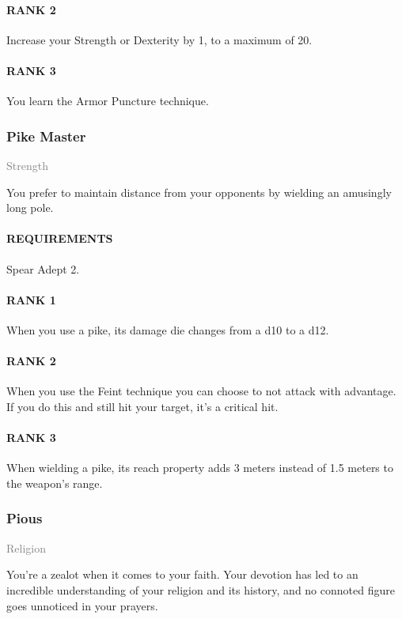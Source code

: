 \paragraph{RANK 2} Increase your Strength or Dexterity by 1, to a maximum of 20.
\paragraph{RANK 3} You learn the Armor Puncture technique.

\subsubsection{Pike Master} \label{feat::pikemaster}
\small{\textcolor{gray}{Strength}}

\normalsize
You prefer to maintain distance from your opponents by wielding an amusingly long pole.
\paragraph{REQUIREMENTS} Spear Adept 2.
\paragraph{RANK 1} When you use a pike, its damage die changes from a d10 to a d12.
\paragraph{RANK 2} When you use the Feint technique you can choose to not attack with advantage.
If you do this and still hit your target, it's a critical hit.
\paragraph{RANK 3} When wielding a pike, its reach property adds 3 meters instead of 1.5 meters to the weapon's range.

\subsubsection{Pious} \label{feat::pious}
\small{\textcolor{gray}{Religion}}

\normalsize
You're a zealot when it comes to your faith.
Your devotion has led to an incredible understanding of your religion and its history, and no connoted figure goes unnoticed in your prayers.
